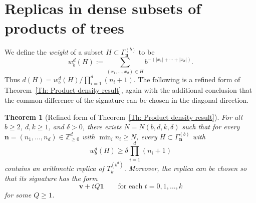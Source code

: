 \documentclass[11pt]{amsart}
\newcommand{\Z}{\mathbb{Z}}  %
\newcommand\labs[1]{\left\lvert#1\right\rvert}
\renewcommand{\geq}{\geqslant}
\theoremstyle{plain}
\newtheorem{thm}{Theorem}[section]
\theoremstyle{definition}
\theoremstyle{remark}
\begin{document}
\section{Replicas in dense subsets of products of trees}
We define the \textit{weight} of a subset $H\subset \Gamma_{\mathbf{n}}^{(b)}$ to be
\[ w_b^d(H) := \sum_{(x_1,\ldots,x_d) \in H} b^{-(\labs{x_1} + \cdots +\labs{x_d})}.\]
Thus $d(H)=w_b^d(H)/\prod_{i=1}^d(n_i+1)$. The following is a refined form of Theorem~\ref{Th: Product density result}, again with the additional conclusion that the common difference of the signature can be chosen in the diagonal direction.
\begin{thm}[Refined form of Theorem~\ref{Th: Product density result}]\label{Thm: Refined product density result}
For all $b\geq 2$, $d,k\geq 1$, and $\delta>0$, there exists $N=N(b,d,k,\delta)$ such that for every $\mathbf{n} = (n_1,\ldots,n_d) \in \Z_{\geq 0}^{d}$ with $\min_{i} n_i \geq N$, every $H \subset \Gamma_{\mathbf{n}}^{(b)}$ with
\[ w_b^d(H) \geq \delta \prod_{i=1}^{d} (n_i +1)\]
contains an arithmetic replica of $T_k^{\left(b^d\right)}$. Moreover, the replica can be chosen so that its signature has the form
\[ \mathbf{v} + tQ \mathbf{1} \qquad \text{for each }t=0,1,\ldots,k\]
for some $Q\geq 1$. 
\end{thm}
\end{document}

